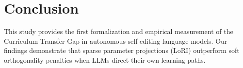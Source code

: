\documentclass[10pt,journal,compsoc]{IEEEtran}
\begin{document}
\section{Conclusion}
This study provides the first formalization and empirical measurement of the Curriculum Transfer Gap in autonomous self-editing language models. Our findings demonstrate that sparse parameter projections (LoRI) outperform soft orthogonality penalties when LLMs direct their own learning paths.
\end{document}
